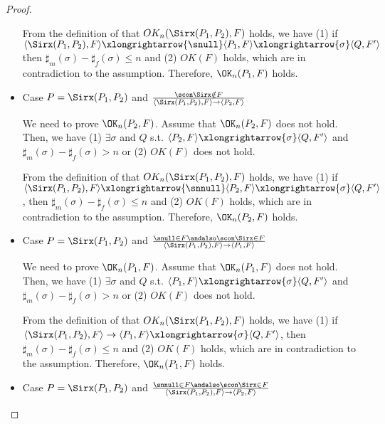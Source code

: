 \begin{proof}
\begin{itemize}
  From the definition of that \(OK_n(\Sirx(P_1, P_2), F)\) holds, we
  have (1) if \( \langle \Sirx(P_1, P_2), F \rangle \xlongrightarrow{\snull}
  \langle P_1, F \rangle \xlongrightarrow{\sigma} \langle Q, F'
  \rangle \) then \(\sharp_m(\sigma) -
  \sharp_f(\sigma) \le n \) and (2) \(OK(F)\) holds, which are in
  contradiction to the assumption.  Therefore, \(\OK_n(P_1, F)\)
  holds.

\item Case \( P = \Sirx(P_1,P_2) \) and \( \frac{ \scon\Sirx \notin F}
  { \langle \Sirx(P_1, P_2), F \rangle \rightarrow \langle P_2, F
    \rangle } \)

  We need to prove \(\OK_n(P_2, F)\).  Assume that \(\OK_n(P_2, F)\)
  does not hold. Then, we have (1) \( \exists \sigma \) and \(Q\)
  s.t. \( \langle P_2, F \rangle \xlongrightarrow{\sigma} \langle Q,
  F' \rangle \) and \(\sharp_{m}(\sigma) -
  \sharp_{f}(\sigma) > n\) or (2) \( OK(F)\) does not hold.

  From the definition of that \(OK_n(\Sirx(P_1, P_2), F)\) holds, we
  have (1) if \( \langle \Sirx(P_1, P_2), F \rangle \xlongrightarrow{\snnull}
  \langle P_2, F \rangle \xlongrightarrow{\sigma} \langle Q, F'
  \rangle \), then \(\sharp_m(\sigma) -
  \sharp_f(\sigma) \le n \) and (2) \(OK(F)\) holds, which are in
  contradiction to the assumption.  Therefore, \(\OK_n(P_2, F)\)
  holds.

\item Case \( P = \Sirx(P_1,P_2) \) and \( \frac{ \snull \in F
  \andalso \scon\Sirx \in F} { \langle \Sirx(P_1, P_2), F \rangle
  \rightarrow \langle P_1, F \rangle } \)

  We need to prove \(\OK_n(P_1, F)\).  Assume that \(\OK_n(P_1, F)\)
  does not hold. Then, we have (1) \( \exists \sigma \) and \(Q\)
  s.t. \( \langle P_1, F \rangle \xlongrightarrow{\sigma} \langle Q,
  F' \rangle \) and \(\sharp_{m}(\sigma) -
  \sharp_{f}(\sigma) > n\) or (2) \( OK(F)\) does not hold.

  From the definition of that \(OK_n(\Sirx(P_1, P_2), F)\) holds, we
  have (1) if \( \langle \Sirx(P_1, P_2), F \rangle \rightarrow
  \langle P_1, F \rangle \xlongrightarrow{\sigma} \langle Q, F'
  \rangle \), then \(\sharp_m(\sigma) -
  \sharp_f(\sigma) \le n \) and (2) \(OK(F)\) holds, which are in
  contradiction to the assumption.  Therefore, \(\OK_n(P_1, F)\)
  holds.

\item Case \( P = \Sirx(P_1,P_2) \) and \( \frac{ \snnull \in F
  \andalso \scon\Sirx \in F} { \langle \Sirx(P_1, P_2), F \rangle
  \rightarrow \langle P_2, F \rangle } \)


\end{itemize}
\end{proof}
